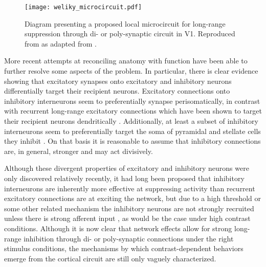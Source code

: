 \begin{figure}
	\centering
        \texttt{[image: weliky\_microcircuit.pdf]}
	\caption{Diagram presenting a proposed local microcircuit for
      long-range suppression through di- or poly-synaptic circuit in
      V1. Reproduced from \cite{Miikkulainen2005} as adapted from
      \cite{Weliky1995}.}
	\label{V1MicroCircuit}
\end{figure}

More recent attempts at reconciling anatomy with function have been
able to further resolve some aspects of the problem. In particular, there is
clear evidence showing that excitatory synapses onto excitatory and
inhibitory neurons differentially target their recipient
neurons. Excitatory connections onto inhibitory interneurons seem to
preferentially synapse perisomatically, in contrast with recurrent
long-range excitatory connections which have been shown to target
their recipient neurons dendritically
\citep{Gilbert1990,McGuire1991}. Additionally, at least a subset of
inhibitory interneurons seem to preferentially target the soma of
pyramidal and stellate cells they inhibit \citep{Markram2004}. On that
basis it is reasonable to assume that inhibitory connections are, in
general, stronger and may act divisively.

Although these divergent properties of excitatory and inhibitory
neurons were only discovered relatively recently, it had long been proposed that
inhibitory interneurons are inherently more effective at suppressing
activity than recurrent excitatory connections are at exciting the
network, but due to a high threshold or some other related mechanism
the inhibitory neurons are not strongly recruited unless there is
strong afferent input \citep{Sillito1979}, as would be the case under
high contrast conditions. Although it is now clear that network
effects allow for strong long-range inhibition through di- or
poly-synaptic connections under the right stimulus conditions, the
mechanisms by which contrast-dependent behaviors emerge from the
cortical circuit are still only vaguely characterized.

